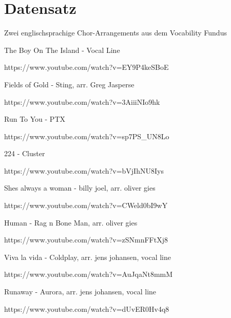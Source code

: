\chapter{Datensatz}
\label{chap:Datensatz}
\pagestyle{plain}

Zwei englischsprachige Chor-Arrangements aus dem Vocability Fundus

The Boy On The Island - Vocal Line

https://www.youtube.com/watch?v=EY9P4keSBoE


Fields of Gold - Sting, arr. Greg Jasperse

https://www.youtube.com/watch?v=3AiiiNIo9hk


Run To You - PTX

https://www.youtube.com/watch?v=sp7PS\_UN8Lo


224 - Cluster

https://www.youtube.com/watch?v=bVjIhNU8Iys


Shes always a woman  - billy joel, arr. oliver gies

https://www.youtube.com/watch?v=CWeld0bI9wY


Human - Rag n Bone Man, arr. oliver gies

https://www.youtube.com/watch?v=zSNmnFFtXj8


Viva la vida - Coldplay, arr. jens johansen, vocal line

https://www.youtube.com/watch?v=AuJqaNt8mmM


Runaway - Aurora, arr. jens johansen, vocal line

https://www.youtube.com/watch?v=dUvER0Hv4q8
